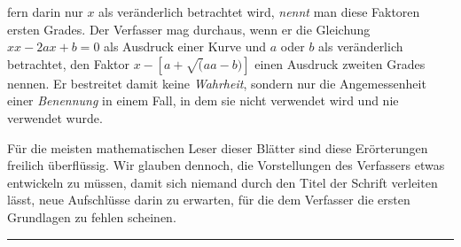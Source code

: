 fern darin nur $x$ als veränderlich betrachtet wird, \textit{nennt} man diese Faktoren ersten Grades. Der Verfasser mag durchaus, wenn er die Gleichung $xx-2ax+b=0$ als Ausdruck einer Kurve und $a$ oder $b$ als veränderlich betrachtet, den Faktor $x-[a+\surd(aa-b)]$ einen Ausdruck zweiten Grades nennen. Er bestreitet damit keine \textit{Wahrheit}, sondern nur die Angemessenheit einer \textit{Benennung} in einem Fall, in dem sie nicht verwendet wird und nie verwendet wurde.\par

Für die meisten mathematischen Leser dieser Blätter sind diese Erörterungen freilich überflüssig. Wir glauben dennoch, die Vorstellungen des Verfassers etwas entwickeln zu müssen, damit sich niemand durch den Titel der Schrift verleiten lässt, neue Aufschlüsse darin zu erwarten, für die dem Verfasser die ersten Grundlagen zu fehlen scheinen.\par
\par\noindent\hfill\rule{0.30\linewidth}{0.4pt}\hfill\mbox{}\par
